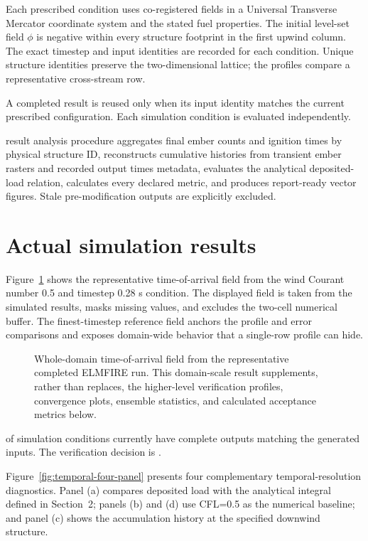 Each prescribed condition uses co-registered fields in a Universal Transverse
Mercator coordinate system and the stated fuel properties. The initial level-set
field \(\phi\) is negative within every structure footprint in the first upwind column.
The exact timestep and input identities are recorded for each condition. Unique
structure identities preserve the two-dimensional lattice; the profiles compare
a representative cross-stream row.

A completed result is reused only when its input identity matches the current
prescribed configuration. Each simulation condition is evaluated independently.

result analysis procedure aggregates final ember counts and ignition times
by physical structure ID, reconstructs cumulative histories from transient
ember rasters and recorded output times metadata, evaluates the analytical deposited-load relation,
calculates every declared metric, and produces report-ready vector figures.
Stale pre-modification outputs are explicitly excluded.

\section{Actual simulation results}

Figure~\ref{fig:domain-result} shows the representative time-of-arrival field from the wind Courant number 0.5 and timestep 0.28 s condition.
The displayed field is taken from the simulated results, masks missing values, and excludes
the two-cell numerical buffer.  The finest-timestep reference field anchors the profile and error comparisons and exposes domain-wide behavior that a single-row profile can hide.

\begin{figure}[H]
\centering
{}
\caption{Whole-domain time-of-arrival field from the representative completed ELMFIRE run.  This
domain-scale result supplements, rather than replaces, the higher-level verification
profiles, convergence plots, ensemble statistics, and calculated acceptance metrics below.}
\label{fig:domain-result}
\end{figure}

\CompletedVariantCount{} of \RequestedVariantCount{} simulation conditions currently have
complete outputs matching the generated inputs. The verification decision is
\textbf{\OverallStatus}.

Figure~\ref{fig:temporal-four-panel} presents four complementary
temporal-resolution diagnostics. Panel (a) compares deposited load with the
analytical integral defined in Section~2; panels (b) and (d) use CFL=0.5 as
the numerical baseline; and panel (c) shows the accumulation history at the
specified downwind structure.

